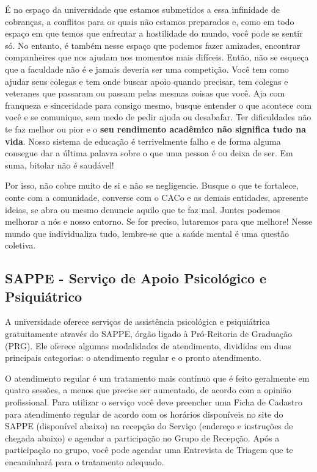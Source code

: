 É no espaço da universidade que estamos submetidos a essa infinidade de cobranças,
a conflitos para os quais não estamos preparados e, como em todo espaço em que
temos que enfrentar a hostilidade do mundo, você pode se sentir só. No entanto, é
também nesse espaço que podemos fazer amizades, encontrar companheires que nos
ajudam nos momentos mais difíceis. Então, não se esqueça que a faculdade não é e
jamais deveria ser uma competição. Você tem como ajudar seus colegas e tem onde
buscar apoio quando precisar, tem colegas e veteranes que passaram ou passam pelas
mesmas coisas que você. Aja com franqueza e sinceridade para consigo mesmo, busque
entender o que acontece com você e se comunique, sem medo de pedir ajuda ou
desabafar. Ter dificuldades não te faz melhor ou pior e o \textbf{seu rendimento acadêmico não
significa tudo na vida}. Nosso sistema de educação é terrivelmente falho e de forma
alguma consegue dar a última palavra sobre o que uma pessoa é ou deixa de ser. Em
suma, bitolar não é saudável!

Por isso, não cobre muito de si e não se negligencie. Busque o que te fortalece, conte
com a comunidade, converse com o CACo e as demais entidades, apresente ideias, se
abra ou mesmo denuncie aquilo que te faz mal. Juntes podemos melhorar a nós e nosso
entorno. Se for preciso, lutaremos para que melhore! Nesse mundo que individualiza
tudo, lembre-se que a saúde mental é uma questão coletiva.

\subsection{SAPPE - Serviço de Apoio Psicológico e Psiquiátrico}

A universidade oferece serviços de assistência psicológica e psiquiátrica gratuitamente através do SAPPE, órgão ligado à Pró-Reitoria de Graduação (PRG). Ele oferece
algumas modalidades de atendimento, divididas em duas principais categorias: o
atendimento regular e o pronto atendimento.

O atendimento regular é um tratamento mais contínuo que é feito geralmente em
quatro sessões, a menos que precise ser aumentado, de acordo com a opinião
profissional. Para utilizar o serviço você deve preencher uma Ficha de Cadastro para
atendimento regular de acordo com os horários disponíveis no site do SAPPE (disponível
abaixo) na recepção do Serviço (endereço e instruções de chegada abaixo) e agendar a
participação no Grupo de Recepção. Após a participação no grupo, você pode agendar
uma Entrevista de Triagem que te encaminhará para o tratamento adequado.

